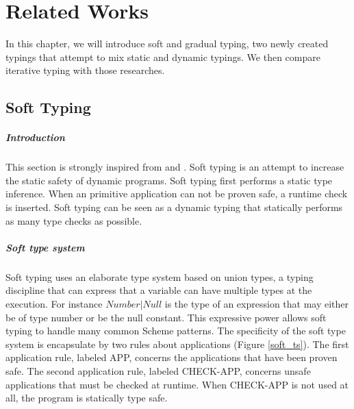 \documentclass[a4paper]{report}
\newcommand{\reffig}[1]{(Figure \ref{#1})}
\begin{document}
\chapter{Related Works\label{ch_related}}

In this chapter, we will introduce soft and gradual typing, two newly created typings that attempt to mix static and dynamic typings. We then compare iterative typing with those researches.

\section{Soft Typing}

\paragraph{Introduction} This section is strongly inspired from \cite{soft1} and \cite{soft3}. Soft typing is an attempt to increase the static safety of dynamic programs. Soft typing first performs a static type inference. When an primitive application can not be proven safe, a runtime check is inserted. Soft typing can be seen as a dynamic typing that statically performs as many type checks as possible.

\paragraph{Soft type system} Soft typing uses an elaborate type system based on union types, a typing discipline that can express that a variable can have multiple types at the execution. For instance $Number|Null$ is the type of an expression that may either be of type number or be the null constant. This expressive power allows soft typing to handle many common Scheme patterns. The specificity of the soft type system is encapsulate by two rules about applications \reffig{soft_ts}. The first application rule, labeled APP, concerns the applications that have been proven safe. The second application rule, labeled CHECK-APP, concerns unsafe applications that must be checked at runtime. When CHECK-APP is not used at all, the program is statically type safe.
\end{document}
